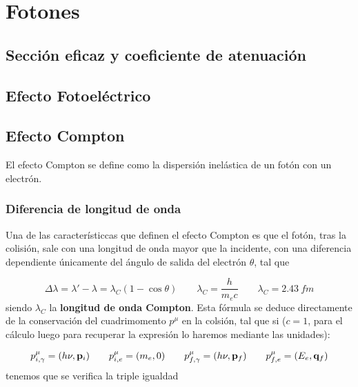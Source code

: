 \chapter{Fotones}

\section{Sección eficaz y coeficiente de atenuación}

\section{Efecto Fotoeléctrico}

\section{Efecto Compton}

El efecto Compton se define como la dispersión inelástica de un fotón con un electrón.

\subsection{Diferencia de longitud de onda}

Una de las característiccas que definen el efecto Compton es que el fotón, tras la colisión, sale con una longitud de onda mayor que la incidente, con una diferencia dependiente únicamente del ángulo de salida del electrón $\theta$, tal que 

\begin{equation}
    \Delta \lambda = \lambda' - \lambda = \lambda_C (1-\cos \theta) \qquad \lambda_C = \frac{h}{m_ec}  \qquad \lambda_C = 2.43 \ \unit{fm}
\end{equation}
siendo $\lambda_C$ la \textbf{longitud de onda Compton}. Esta fórmula se deduce directamente de la conservación del cuadrimomento $p^\mu$ en la colsión, tal que si ($c=1$, para el cálculo luego para recuperar la expresión lo haremos mediante las unidades):

\begin{equation}
    p_{i,\gamma}^\mu = \pqty{h \nu, \pn_i } \qquad 
    p_{i,e}^\mu = \pqty{m_e, 0} \qquad 
    p_{f,\gamma}^\mu = \pqty{h \nu, \pn_f } \qquad 
    p_{f,e}^\mu = \pqty{E_e, \qn_f }
\end{equation}
tenemos que se verifica la triple igualdad

